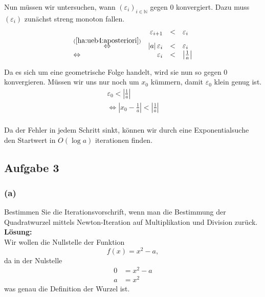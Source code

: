 \documentclass[11pt,a4paper,ngerman]{article}
\begin{document}
Nun müssen wir untersuchen, wann $(\varepsilon_i)_{i\in \mathbb{N}}$ gegen $0$ konvergiert. 
Dazu muss $(\varepsilon_i)$ zunächst streng monoton fallen.
\begin{equation}\label{ha:ueb4:monoton} \begin{array}{lrcl}
    &\varepsilon_{i+1} &<& \varepsilon_i \\
    \stackrel{(\ref{ha:ueb4:aposteriori})}{\Leftrightarrow}&
         \left| a \right| \varepsilon_i &<& \varepsilon_i\\
    \Leftrightarrow& \varepsilon_i &<& \left| \frac{1}{a} \right|
\end{array}\end{equation}

Da es sich um eine geometrische Folge handelt, wird sie nun so gegen 0 konvergieren.
Müssen wir uns nur noch um $x_0$ kümmern, damit $\varepsilon_0$ klein genug ist.
\begin{equation}\label{ha:ueb4:start}\begin{split}
    \varepsilon_0 < \left| \frac{1}{a} \right|\\
    \Leftrightarrow \left| x_0 - \frac{1}{a} \right| < \left| \frac{1}{a} \right|\\
\end{split}\end{equation}

Da der Fehler in jedem Schritt sinkt, können wir durch eine Exponentialsuche den Startwert in $O(\log a)$ iterationen finden.

\subsection*{Aufgabe 3}

\subsubsection*{(a)}

Bestimmen Sie die Iterationsvorschrift, wenn man die Bestimmung der Quadratwurzel mittels Newton-Iteration auf Multiplikation
und Division zurück.\\

\textbf{Lösung:}\\

Wir wollen die Nullstelle der Funktion
\begin{equation}
    f(x) = x^2 - a,
\end{equation}
da in der Nulstelle
\begin{equation*}\begin{split}
    0 &= x^2 - a\\
    a &= x^2
\end{split}\end{equation*}
was genau die Definition der Wurzel ist.\\
\end{document}
